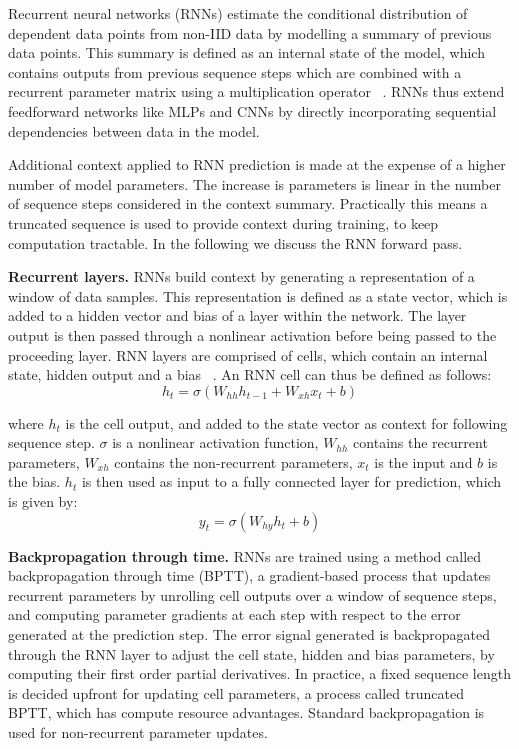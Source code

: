 \noindent Recurrent neural networks (RNNs) estimate the conditional distribution of dependent data points from non-IID data by modelling a summary of previous data points. This summary is defined as an internal state of the model, which contains outputs from previous sequence steps which are combined with a recurrent parameter matrix using a multiplication operator \unskip ~\citep{werbos1988generalization}. RNNs thus extend feedforward networks like MLPs and CNNs by directly incorporating sequential dependencies between data in the model. \par

\noindent Additional context applied to RNN prediction is made at the expense of a higher number of model parameters. The increase is parameters is linear in the number of sequence steps considered in the context summary. Practically this means a truncated sequence is used to provide context during training, to keep computation tractable. In the following we discuss the RNN forward pass. \par

\noindent \textbf{Recurrent layers.} RNNs build context by generating a representation of a window of data samples. This representation is defined as a state vector, which is added to a hidden vector and bias of a layer within the network. The layer output is then passed through a nonlinear activation before being passed to the proceeding layer. RNN layers are comprised of cells, which contain an internal state, hidden output and a bias \unskip ~\citep{DLIndaba2018}. An RNN cell can thus be defined as follows: 
\begin{equation}
	h_t = \sigma(W_{hh}h_{t-1} + W_{xh}x_t + b)
\end{equation}

\noindent where $h_t$ is the cell output, and added to the state vector as context for following sequence step. $\sigma$ is a nonlinear activation function, $W_{hh}$ contains the recurrent parameters, $W_{xh}$ contains the non-recurrent parameters, $x_t$ is the input and $b$ is the bias. $h_t$ is then used as input to a fully connected layer for prediction, which is given by:
\begin{equation}
	y_t = \sigma(W_{hy}h_{t} + b)
\end{equation}

\noindent \textbf{Backpropagation through time.} RNNs are trained using a method called backpropagation through time (BPTT),  a gradient-based process that updates recurrent parameters by unrolling cell outputs over a window of sequence steps, and computing parameter gradients at each step with respect to the error generated at the prediction step. The error signal generated is backpropagated through the RNN layer to adjust the cell state, hidden and bias parameters, by computing their first order partial derivatives. In practice, a fixed sequence length is decided upfront for updating cell parameters, a process called truncated BPTT, which has compute resource advantages. Standard backpropagation is used for non-recurrent parameter updates. \par

